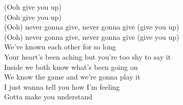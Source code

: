\begin{verseplay}[10em]
(Ooh give you up)\\
(Ooh give you up)\\
(Ooh) never gonna give, never gonna give (give you up)\\
(Ooh) never gonna give, never gonna give (give you up)\\

We've known each other for so long\\
Your heart's been aching but you're too shy to say it\\
Inside we both know what's been going on\\
We know the game and we're gonna play it\\

I just wanna tell you how I'm feeling\\
Gotta make you understand\\
\end{verseplay}


